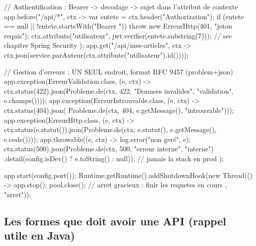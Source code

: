 \documentclass[12pt,a4paper,twoside,openright]{book}
\begin{document}
\begin{codejava}
{{        // Authentification : Bearer -> decodage -> sujet dans l'attribut de contexte
        app.before("/api/*", ctx -> {
            var entete = ctx.header("Authorization");
            if (entete == null || !entete.startsWith("Bearer ")) { throw new ErreurHttp(401, "jeton requis"); }
            ctx.attribute("utilisateur", jwt.verifier(entete.substring(7)));  // see chapitre Spring Security
        });
        app.get("/api/mes-articles", ctx -> ctx.json(service.parAuteur(ctx.attribute("utilisateur").id())));

        // Gestion d'erreurs : UN SEUL endroit, format RFC 9457 (problem+json)
        app.exception(ErreurValidation.class, (e, ctx) -> ctx.status(422).json(Probleme.de(ctx, 422,
                "Donnees invalides", "validation", e.champs())));
        app.exception(ErreurIntrouvable.class, (e, ctx) -> ctx.status(404).json(
                Probleme.de(ctx, 404, e.getMessage(), "introuvable")));
        app.exception(ErreurHttp.class, (e, ctx) -> ctx.status(e.statut()).json(Probleme.de(ctx, e.statut(), e.getMessage(), e.code())));
        app.throwable((e, ctx) -> {
            log.error("non ger\'e", e);
            ctx.status(500).json(Probleme.de(ctx, 500, "erreur interne", "interne")
                    .detail(config.isDev() ? e.toString() : null));     // jamais la stack en prod
        });

        app.start(config.port());
        Runtime.getRuntime().addShutdownHook(new Thread(() -> {
            app.stop();
            pool.close();                       // arret gracieux : finir les requetes en cours
        }, "arret"));
    }
}
\end{codejava}

\subsection{Les formes que doit avoir une API (rappel utile en Java)}
\end{document}
